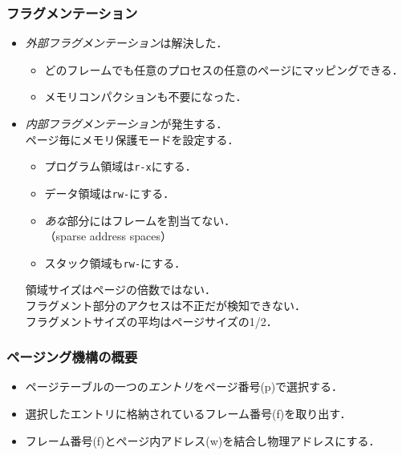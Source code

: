 \documentclass[unicode,handout]{beamer}                   %
\begin{document}
\begin{frame}
  \frametitle{フラグメンテーション}
  \begin{minipage}{0.35\columnwidth}
  \end{minipage}
  \begin{minipage}{0.63\columnwidth}
    \begin{itemize}
    \item \emph{外部フラグメンテーション}は解決した．
      \begin{itemize}
      \item どのフレームでも任意のプロセスの任意のページにマッピングできる．
      \item メモリコンパクションも不要になった．
      \end{itemize}
    \item \emph{内部フラグメンテーション}が発生する．\\
      ページ毎にメモリ保護モードを設定する．
      \begin{itemize}
        \item プログラム領域は\texttt{r-x}にする．
        \item データ領域は\texttt{rw-}にする．
        \item \emph{あな}部分にはフレームを割当てない．\\
          （sparse address spaces）
        \item スタック領域も\texttt{rw-}にする．
      \end{itemize}
      領域サイズはページの倍数ではない．\\
      フラグメント部分のアクセスは不正だが検知できない．\\
      フラグメントサイズの平均はページサイズの1/2．
    \end{itemize}
  \end{minipage}
\end{frame}

\begin{frame}
  \frametitle{ページング機構の概要}
  \begin{itemize}
  \item ページテーブルの一つの\emph{エントリ}をページ番号(p)で選択する．
  \item 選択したエントリに格納されているフレーム番号(f)を取り出す．
  \item フレーム番号(f)とページ内アドレス(w)を結合し物理アドレスにする．
  \end{itemize}
\end{frame}
\end{document}
